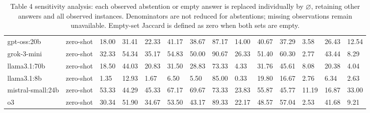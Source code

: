 \begin{table}[!t]
\begin{tabular}{llllllllllllll}
gpt-oss:20b & zero-shot & 18.00 & 31.41 & 22.33 & 41.17 & 38.67 & 87.17 & 14.00 & 40.67 & 37.29 & 3.58 & 26.43 & 12.54 \\
grok-3-mini & zero-shot & 32.33 & 54.34 & 35.17 & 54.83 & 50.00 & 90.67 & 26.33 & 51.40 & 60.30 & 2.77 & 43.44 & 8.29 \\
llama3.1:70b & zero-shot & 18.50 & 44.03 & 20.83 & 31.50 & 28.83 & 73.33 & 4.33 & 31.76 & 45.61 & 8.08 & 20.38 & 4.04 \\
llama3.1:8b & zero-shot & 1.35 & 12.93 & 1.67 & 6.50 & 5.50 & 85.00 & 0.33 & 19.80 & 16.67 & 2.76 & 6.34 & 2.63 \\
mistral-small:24b & zero-shot & 53.33 & 44.29 & 45.33 & 67.17 & 69.67 & 73.33 & 23.83 & 55.87 & 45.77 & 11.19 & 16.87 & 33.00 \\
o3 & zero-shot & 30.34 & 51.90 & 34.67 & 53.50 & 43.17 & 89.33 & 22.17 & 48.57 & 57.04 & 2.53 & 41.68 & 9.21 \\
\bottomrule
\end{tabular}
\caption{Table 4 sensitivity analysis: each observed abstention or empty answer is replaced individually by $\varnothing$, retaining other answers and all observed instances. Denominators are not reduced for abstentions; missing observations remain unavailable. Empty-set Jaccard is defined as zero when both sets are empty.}
\label{tab:consistency_per_action_filtering}
\end{table}
